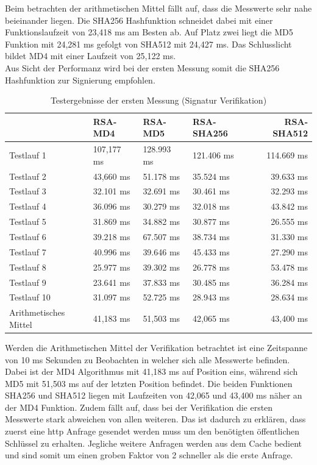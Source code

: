Beim betrachten der arithmetischen Mittel fällt auf, dass die Messwerte sehr nahe beieinander liegen. Die SHA256 Hashfunktion schneidet dabei mit einer Funktionslaufzeit von 23,418 ms am Besten ab. Auf Platz zwei liegt die MD5 Funktion mit 24,281 ms gefolgt von SHA512 mit 24,427 ms. Das Schlusslicht bildet MD4 mit einer Laufzeit von 25,122 ms.\\
Aus Sicht der Performanz wird bei der ersten Messung somit die SHA256 Hashfunktion zur Signierung empfohlen.
\begin{table}[h]
	\begin{tabularx}{\textwidth}{p{}|X|X|X|r}
		& RSA-MD4 & RSA-MD5 & RSA-SHA256 & RSA-SHA512\\
		\hline
		Testlauf 1& 107,177 ms& 128.993 ms& 121.406 ms& 114.669 ms\\
		Testlauf 2& 43,660 ms& 51.178 ms& 35.524 ms& 39.633 ms\\
		Testlauf 3& 32.101 ms& 32.691 ms& 30.461 ms& 32.293 ms\\
		Testlauf 4& 36.096 ms& 30.279 ms& 32.018 ms& 43.842 ms\\
		Testlauf 5& 31.869 ms& 34.882 ms& 30.877 ms& 26.555 ms\\
		Testlauf 6& 39.218 ms& 67.507 ms& 38.734 ms& 31.330 ms\\
		Testlauf 7& 40.996 ms& 39.646 ms& 45.433 ms& 27.290 ms\\
		Testlauf 8& 25.977 ms& 39.302 ms& 26.778 ms& 53.478 ms\\
		Testlauf 9& 23.641 ms& 37.833 ms& 30.485 ms& 36.284 ms\\
		Testlauf 10& 31.097 ms& 52.725 ms& 28.943 ms& 28.634 ms\\
		\hline
		Arithmetisches Mittel& 41,183 ms& 51,503 ms& 42,065 ms& 43,400 ms
	\end{tabularx}
	\caption{Testergebnisse der ersten Messung (Signatur Verifikation)}
\end{table}
Werden die Arithmetischen Mittel der Verifikation betrachtet ist eine Zeitspanne von 10 ms Sekunden zu Beobachten in welcher sich alle Messwerte befinden. Dabei ist der MD4 Algorithmus mit 41,183 ms auf Position eins, während sich MD5 mit 51,503 ms auf der letzten Position befindet. Die beiden Funktionen SHA256 und SHA512 liegen mit Laufzeiten von 42,065 und 43,400 ms näher an der MD4 Funktion. Zudem fällt auf, dass bei der Verifikation die ersten Messwerte stark abweichen von allen weiteren. Das ist dadurch zu erklären, dass zuerst eine \gls{http} Anfrage gesendet werden muss um den benötigten öffentlichen Schlüssel zu erhalten. Jegliche weitere Anfragen werden aus dem Cache bedient und sind somit um einen groben Faktor von 2 schneller als die erste Anfrage.\\
